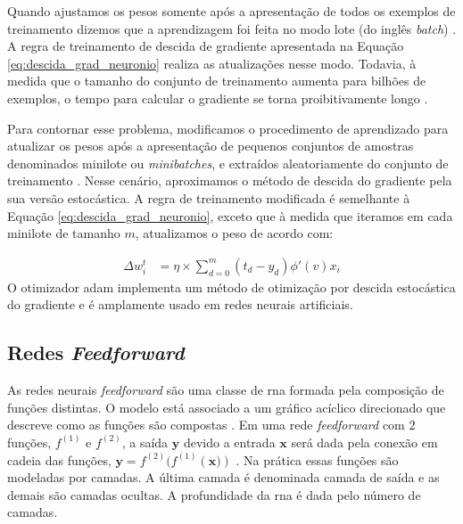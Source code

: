 Quando ajustamos os pesos somente após a apresentação de todos os exemplos de treinamento dizemos que a aprendizagem foi feita no modo lote (do inglês \textit{batch}) \cite{Haykin}.  A regra de treinamento de descida de gradiente apresentada na Equação \ref{eq:descida_grad_neuronio} realiza as atualizações nesse modo. Todavia, à medida que o tamanho do conjunto de treinamento aumenta para bilhões de exemplos, o tempo para calcular o gradiente se torna proibitivamente longo \cite{Goodfellow2016}.

Para contornar esse problema, modificamos o procedimento de aprendizado para atualizar os pesos após a apresentação de pequenos conjuntos de amostras denominados minilote ou \textit{minibatches}, e extraídos aleatoriamente do conjunto de treinamento \cite{Goodfellow2016}. Nesse cenário, aproximamos o método de descida do gradiente pela sua versão estocástica. 
A regra de treinamento modificada é semelhante à Equação \ref{eq:descida_grad_neuronio}, exceto que à medida que iteramos em cada minilote de tamanho $m$, atualizamos o peso de acordo com:

\begin{equation}
\label{eq:descida_grad__estocastica_neuronio}
\begin{aligned}
\Delta{w}^{t}_{i} &=  \eta \times \sum_{d=0}^{m} (t_{d} - y_{d})\phi'(v)x_{i}
\end{aligned}
\end{equation}
O otimizador \gls{adam} \cite{kingma2014adam} implementa um método de otimização por descida estocástica do gradiente e é amplamente usado em redes neurais artificiais.  

\subsection{Redes \textit{Feedforward}}

As redes neurais \textit{feedforward} são uma classe de \acrshort{rna} formada pela composição de funções distintas.  O modelo está associado a um gráfico acíclico direcionado que descreve como as funções são compostas \cite{Goodfellow2016}. Em uma rede \textit{feedforward} com 2 funções,  $f^{(1)}$ e $f^{(2)}$, a saída $\textbf{y}$ devido a entrada $\textbf{x}$  será dada pela conexão em cadeia das funções, $ \textbf{y} = f^{(2)}(f^{(1)}(\textbf{x)})$ \cite{Goodfellow2016}. Na prática essas funções são modeladas por camadas.
A última camada é denominada camada de saída e as demais são camadas ocultas. A profundidade da \acrshort{rna} é dada pelo número de camadas.  

